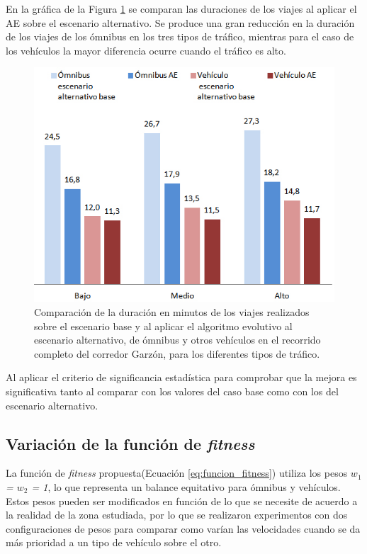 En la gráfica de la Figura \ref{fig:duracion_viajes_alernativo} se comparan las duraciones de los viajes al aplicar el AE sobre el escenario alternativo. Se produce una gran reducción en la duración de los viajes de los ómnibus en los tres tipos de tráfico, mientras para el caso de los vehículos la mayor diferencia ocurre cuando el tráfico es alto.

\begin{figure}[H]
	\centering
	\includegraphics[width=0.8\linewidth]{Figures/duracio_viajes_alternativo}
	\caption[Comparación de la duración de los viajes en minutos entre el escenario base y el algoritmo evolutivo sobre el escenario alternativo.]{Comparación de la duración en minutos de los viajes realizados sobre el escenario base y al aplicar el algoritmo evolutivo  al escenario alternativo, de ómnibus y otros vehículos en el recorrido completo del corredor Garzón, para los diferentes tipos de tráfico.}
	\label{fig:duracion_viajes_alernativo}
\end{figure}

Al aplicar el criterio de significancia estadística para comprobar que la mejora es significativa tanto al comparar con los valores del caso base como con los del escenario alternativo.

\subsection{Variación de la función de \emph{fitness}}

La función de \emph{fitness} propuesta(Ecuación \ref{eq:funcion_fitness}) utiliza los pesos \emph{$w_1$ = $w_2$ = 1}, lo que representa un balance equitativo para ómnibus y vehículos. Estos pesos pueden ser modificados en función de lo que se necesite de acuerdo a la realidad de la zona estudiada, por lo que se realizaron experimentos con dos configuraciones de pesos para comparar como varían las velocidades cuando se da más prioridad a un tipo de vehículo sobre el otro.

